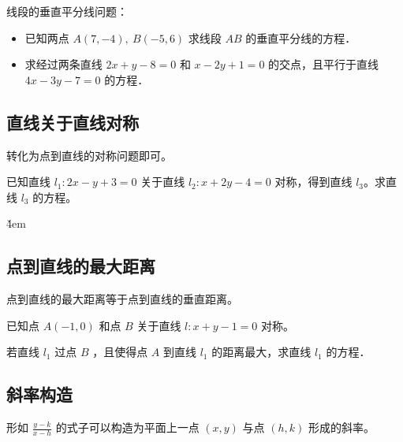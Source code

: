 \begin{example}
    线段的垂直平分线问题：
    \begin{itemize}
        \item[（1）] 已知两点 $A(7,-4), ~ B(-5,6)$ 求线段 $A B$ 的垂直平分线的方程．
        \item[（2）] 求经过两条直线 $2 x+y-8=0$ 和 $x-2 y+1=0$ 的交点，且平行于直线 $4 x-3 y-7=0$ 的方程．
    \end{itemize}
\end{example}

\vspace{4em}

\subsection{直线关于直线对称}

\begin{theorem}
    转化为点到直线的对称问题即可。
\end{theorem}

\begin{example}
    已知直线 $l_1: 2x-y+3=0$ 关于直线 $l_2: x+2y-4=0$ 对称，得到直线 $l_3$。求直线 $l_3$ 的方程。
\end{example}

\v{4em}

\subsection{点到直线的最大距离}

\begin{theorem}
    点到直线的最大距离等于点到直线的垂直距离。
\end{theorem}

\begin{example}
    已知点 $A(-1,0)$ 和点 $B$ 关于直线 $l: x+y-1=0$ 对称。

    若直线 $l_1$ 过点 $B$ ，且使得点 $A$ 到直线 $l_1$ 的距离最大，求直线 $l_1$ 的方程．
\end{example}

\vspace{4em}

\subsection{斜率构造}

\begin{theorem}
    形如 $\frac{y-k}{x-h}$ 的式子可以构造为平面上一点 $(x,y)$ 与点 $(h,k)$ 形成的斜率。
\end{theorem}

